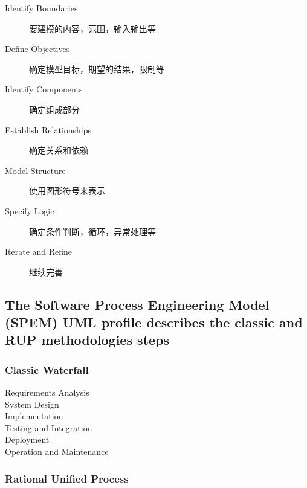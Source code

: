 \documentclass[11pt,journal,compsoc]{IEEEtran}
\begin{document}
\begin{description}
    \item[Identify Boundaries] 要建模的内容，范围，输入输出等

    \item[Define Objectives] 确定模型目标，期望的结果，限制等

    \item[Identify Components] 确定组成部分

    \item[Establish Relationships] 确定关系和依赖

    \item[Model Structure] 使用图形符号来表示

    \item[Specify Logic] 确定条件判断，循环，异常处理等

    \item[Iterate and Refine] 继续完善
\end{description}


\subsection{The Software Process Engineering Model (SPEM) UML profile describes the classic and RUP methodologies steps}


\subsubsection{Classic Waterfall}

\begin{description}
    \item[Requirements Analysis] 

    \item[System Design] 

    \item[Implementation] 

    \item[Testing and Integration] 

    \item[Deployment] 

    \item[Operation and Maintenance] 
\end{description}


\subsubsection{Rational Unified Process}
\end{document}
